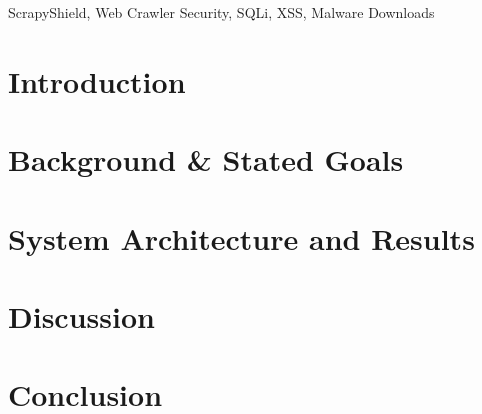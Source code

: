 \maketitle

\begin{abstract}
  
\end{abstract}

\begin{IEEEkeywords}
  ScrapyShield, Web Crawler Security, SQLi, XSS, Malware Downloads
\end{IEEEkeywords}

\section{Introduction}


\section{Background \& Stated Goals}


\section{System Architecture and Results}


\section{Discussion}


\section{Conclusion}






